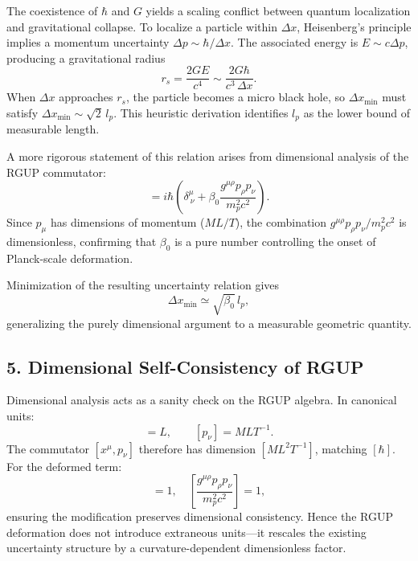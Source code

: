 \documentclass[11pt,oneside]{book}
\numberwithin{equation}{chapter}
\newcommand{\betaz}{\beta_0}
\begin{document}
The coexistence of $\hbar$ and $G$ yields a scaling conflict between quantum localization and gravitational collapse.  
To localize a particle within $\Delta x$, Heisenberg’s principle implies a momentum uncertainty $\Delta p \sim \hbar / \Delta x$.  
The associated energy is $E \sim c \Delta p$, producing a gravitational radius
\begin{equation}
r_s = \frac{2GE}{c^4} \sim \frac{2G\hbar}{c^3\,\Delta x}.
\end{equation}
When $\Delta x$ approaches $r_s$, the particle becomes a micro black hole, so $\Delta x_{\min}$ must satisfy $\Delta x_{\min} \sim \sqrt{2}\,l_p$.  
This heuristic derivation identifies $l_p$ as the lower bound of measurable length.

A more rigorous statement of this relation arises from dimensional analysis of the RGUP commutator:
\begin{equation}
[x^\mu,p_\nu] = i\hbar
\left(\delta^\mu_{\ \nu} + \betaz \frac{g^{\mu\rho}p_\rho p_\nu}{m_p^2 c^2}\right).
\end{equation}
Since $p_\mu$ has dimensions of momentum ($ML/T$), the combination $g^{\mu\rho}p_\rho p_\nu / m_p^2 c^2$ is dimensionless, confirming that $\betaz$ is a pure number controlling the onset of Planck-scale deformation.  

Minimization of the resulting uncertainty relation gives
\begin{equation}
\Delta x_{\min} \simeq \sqrt{\betaz}\,l_p,
\end{equation}
generalizing the purely dimensional argument to a measurable geometric quantity.

\subsection*{5. Dimensional Self-Consistency of RGUP}

Dimensional analysis acts as a sanity check on the RGUP algebra.  
In canonical units:
\begin{equation}
[x^\mu] = L, \qquad [p_\nu] = MLT^{-1}.
\end{equation}
The commutator $[x^\mu,p_\nu]$ therefore has dimension $[ML^2T^{-1}]$, matching $[\hbar]$.  
For the deformed term:
\begin{equation}
[\betaz] = 1, \quad
\left[\frac{g^{\mu\rho}p_\rho p_\nu}{m_p^2 c^2}\right] = 1,
\end{equation}
ensuring the modification preserves dimensional consistency.  
Hence the RGUP deformation does not introduce extraneous units—it rescales the existing uncertainty structure by a curvature-dependent dimensionless factor.
\end{document}
